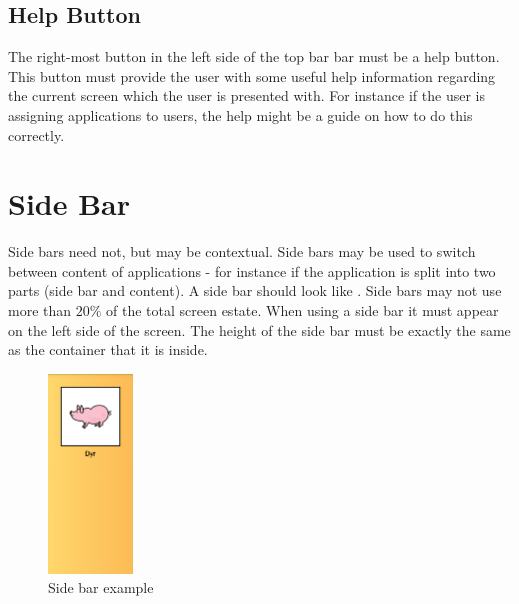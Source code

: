 \subsection{Help Button}
\label{sec:help_button}
The right-most button in the left side of the top bar bar must be a help button. This button must provide the user with some useful help information regarding the current screen which the user is presented with. For instance if the user is assigning applications to users, the help might be a guide on how to do this correctly.

\FloatBarrier


\section{Side Bar}

Side bars need not, but may be contextual. Side bars may be used to switch between content of applications - for instance if the application is split into two parts (side bar and content). A side bar should look like . Side bars may not use more than $20\%$ of the total screen estate. When using a side bar it must appear on the left side of the screen. The height of the side bar must be exactly the same as the container that it is inside.


\begin{note}
\end{note}

\begin{figure}[!htbp]
        \centering
        \includegraphics[width=0.20\textwidth]{pictures/application_structure/sidebar}
        \caption{Side bar example}
        \label{fig:side_bar_example}
\end{figure}

